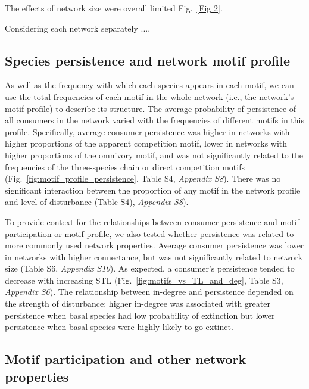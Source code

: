 \documentclass[12pt]{article}
\begin{document}
\begin{spacing}{2.0}
         The effects of network size were overall limited Fig.~\ref{Fig 2}.
        
        Considering each network separately ....
        

    \subsection*{Species persistence and network motif profile}

        As well as the frequency with which each species appears in each motif, we can use the total frequencies of each motif in the whole network (i.e., the network's motif profile) to describe its structure.
        The average probability of persistence of all consumers in the network varied with the frequencies of different motifs in this profile.
        Specifically, average consumer persistence was higher in networks with higher proportions of the apparent competition motif, lower in networks with higher proportions of the omnivory motif, and was not significantly related to the frequencies of the three-species chain or direct competition motifs (Fig.~\ref{fig:motif_profile_persistence}, Table S4, \emph{Appendix S8}). 
        There was no significant interaction between the proportion of any motif in the network profile and level of disturbance (Table S4), \emph{Appendix S8}).


        To provide context for the relationships between consumer persistence and motif participation or motif profile, we also tested whether persistence was related to more commonly used network properties.
        Average consumer persistence was lower in networks with higher connectance, but was not significantly related to network size (Table S6, \emph{Appendix S10}).
        As expected, a consumer's persistence tended to decrease with increasing STL (Fig.~\ref{fig:motifs_vs_TL_and_deg}, Table S3, \emph{Appendix S6}).
        The relationship between in-degree and persistence depended on the strength of disturbance: higher in-degree was associated with greater persistence when basal species had low probability of extinction but lower persistence when basal species were highly likely to go extinct.


    \subsection*{Motif participation and other network properties}


\end{spacing}
\end{document}
